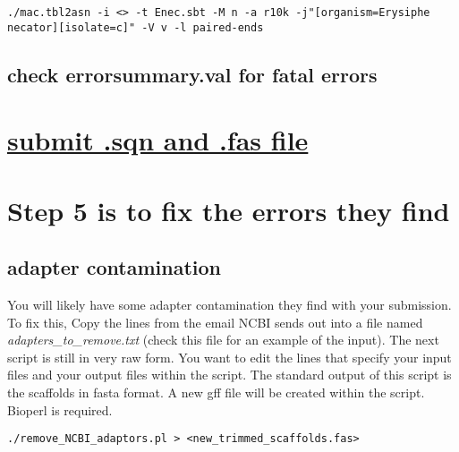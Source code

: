 \documentclass[11pt]{article}
\begin{document}
\begin{verbatim}
./mac.tbl2asn -i <> -t Enec.sbt -M n -a r10k -j"[organism=Erysiphe necator][isolate=c]" -V v -l paired-ends
\end{verbatim}



\subsection*{check errorsummary.val for fatal errors}
\label{sec-4.2}

\section*{\hyperref[color:red]{submit .sqn and .fas file}}
\label{sec-5}

\section*{Step 5 is to fix the errors they find}
\label{sec-6}

\subsection*{adapter contamination}
\label{sec-6.1}

You will likely have some adapter contamination they find with your submission. To fix this, Copy the lines from the email
NCBI sends out into a file named \emph{adapters\_{}to\_{}remove.txt} (check this file for an example of the input). The next script is still in very raw form. You want to edit the lines
that specify your input files and your output files within the script. The standard output of this script is the scaffolds in 
fasta format. A new gff file will be created within the script. Bioperl is required. 


\begin{verbatim}
./remove_NCBI_adaptors.pl > <new_trimmed_scaffolds.fas>
\end{verbatim}
\end{document}
